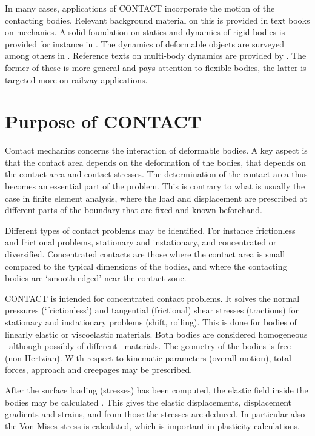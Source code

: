\documentclass[12pt]{report}
\begin{document}
In many cases, applications of CONTACT incorporate the motion of the contacting
bodies. Relevant background material on this is provided in text books on
mechanics. A solid foundation on statics and dynamics of rigid bodies is
provided for instance in \cite{Hibbeler2012}. The dynamics of deformable
objects are surveyed among others in \cite{Craig2006}. Reference texts on
multi-body dynamics are provided by \cite{Shabana2013,Shabana2008}. The
former of these is more general and pays attention to flexible bodies, the
latter is targeted more on railway applications.

\section{Purpose of CONTACT}

Contact mechanics concerns the interaction of deformable bodies. A key
aspect is that the contact area depends on the deformation of the bodies,
that depends on the contact area and contact stresses. The determination of
the contact area thus becomes an essential part of the problem.
This is contrary to what is usually the case in finite element analysis,
where the load and displacement are prescribed at different parts of the
boundary that are fixed and known beforehand.

Different types of contact problems may be identified. For instance
frictionless and frictional problems, stationary and instationary, and
concentrated or diversified. Concentrated contacts are those where the
contact area is small compared to the typical dimensions of the bodies,
and where the contacting bodies are `smooth edged' near the contact zone.

CONTACT is intended for concentrated contact problems. It solves the normal
pressures (`frictionless') and tangential (frictional) shear stresses
(tractions) for stationary and instationary problems (shift, rolling). This
is done for bodies of linearly elastic or viscoelastic materials. Both
bodies are considered homogeneous --although possibly of different--
materials.  The geometry of the bodies is free (non-Hertzian).  With
respect to kinematic parameters (overall motion), total forces, approach
and creepages may be prescribed.

After the surface loading (stresses) has been computed, the elastic field
inside the bodies may be calculated \cite{Kalker1986a,Wekken2019a-subsurf}.
This gives the elastic displacements, displacement gradients and strains,
and from those the stresses are deduced. In particular also the Von Mises
stress is calculated, which is important in plasticity calculations.
\end{document}
